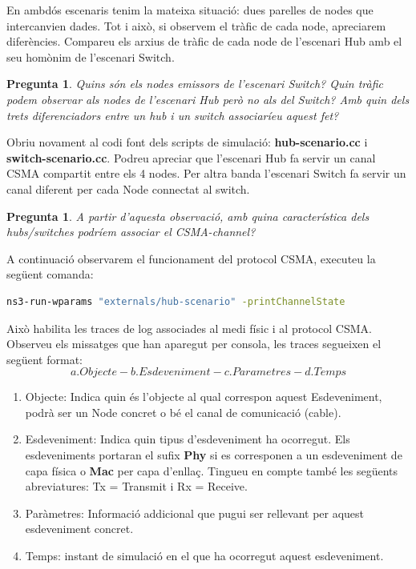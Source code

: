 \documentclass[12pt,a4paper]{article}
\newcounter{exercises}
\newtheorem{exer}[exercises]{Pregunta}
\begin{document}
\begin{enumerate}
En ambdós escenaris tenim la mateixa situació: dues parelles de nodes que intercanvien dades. Tot i això, si observem el tràfic de cada node, apreciarem diferències. Compareu els arxius de tràfic de cada node de l'escenari Hub amb el seu homònim de l'escenari Switch.

\begin{exer} Quins són els nodes emissors de l'escenari Switch? Quin tràfic podem observar als nodes de l'escenari Hub però no als del Switch? Amb quin dels trets diferenciadors entre un hub i un switch associaríeu aquest fet? \end{exer}

Obriu novament al codi font dels scripts de simulació: \textbf{hub-scenario.cc} i \textbf{switch-scenario.cc}. Podreu apreciar que l'escenari Hub fa servir un canal CSMA compartit entre els 4 nodes. Per altra banda l'escenari Switch fa servir un canal diferent per cada Node connectat al switch.

\begin{exer} A partir d'aquesta observació, amb quina característica dels hubs/switches podríem associar el CSMA-channel? \end{exer}

A continuació observarem el funcionament del protocol CSMA, executeu la següent comanda:

\begin{lstlisting}[language=bash,basicstyle=\footnotesize]
   ns3-run-wparams "externals/hub-scenario" -printChannelState
\end{lstlisting}
Això habilita les traces de log associades al medi físic i al protocol CSMA. Observeu els missatges que han aparegut per consola, les traces segueixen el següent format:
$$
a. Objecte  - b. Esdeveniment - c. Parametres - d. Temps $$

\begin{enumerate}
\item Objecte: Indica quin és l'objecte al qual correspon aquest Esdeveniment, podrà ser un Node concret o bé el canal de comunicació (cable).
\item Esdeveniment: Indica quin tipus d'esdeveniment ha ocorregut. Els esdeveniments portaran el sufix \textbf{Phy} si es corresponen a un esdeveniment de capa física o \textbf{Mac} per capa d'enllaç. Tingueu en compte també les següents abreviatures: Tx = Transmit i Rx = Receive.
\item Paràmetres: Informació addicional que pugui ser rellevant per aquest esdeveniment concret.
\item Temps: instant de simulació en el que ha ocorregut aquest esdeveniment.
\end{enumerate}


\end{enumerate}
\end{document}
